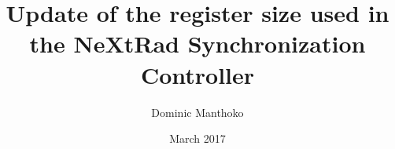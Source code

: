 \documentclass[12pt, a4paper, twoside]{article}
\title{Update of the register size used in the NeXtRad Synchronization Controller}
\author{Dominic Manthoko}
\date{March 2017}
\begin{document}
\begin{titlepage}
\maketitle
\end{titlepage}
\end{document}
